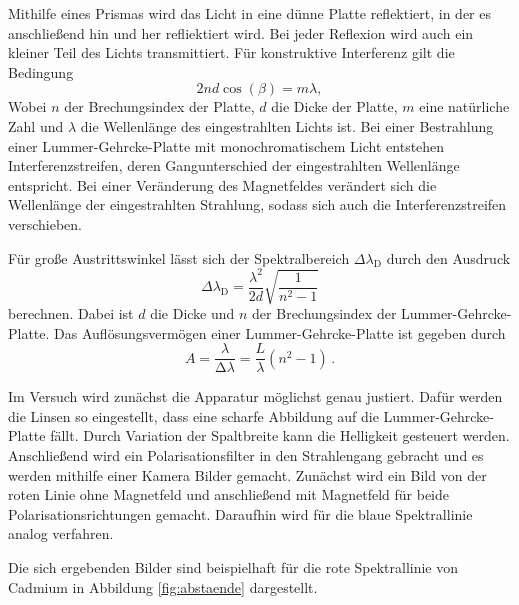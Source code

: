 Mithilfe eines Prismas wird das Licht in eine dünne Platte reflektiert, in der
es anschließend hin und her refliektiert wird. Bei jeder Reflexion wird auch ein kleiner
Teil des Lichts transmittiert. Für konstruktive Interferenz gilt die Bedingung
\begin{equation}
  2n d \cos(\beta)=m \lambda,
\end{equation}
Wobei $n$ der Brechungsindex der Platte, $d$ die Dicke der Platte, $m$ eine natürliche
Zahl und $\lambda$ die Wellenlänge des eingestrahlten Lichts ist. Bei einer Bestrahlung einer
Lummer-Gehrcke-Platte mit monochromatischem Licht entstehen Interferenzstreifen, deren
Gangunterschied der eingestrahlten Wellenlänge entspricht. Bei einer Veränderung
des Magnetfeldes verändert sich die Wellenlänge der eingestrahlten Strahlung, sodass
sich auch die Interferenzstreifen verschieben.

Für große Austrittswinkel lässt sich der Spektralbereich $\Delta \lambda_\text{D}$ durch
den Ausdruck
\begin{equation}
   \Delta \lambda_\text{D} = \frac{\lambda^2}{2d} \sqrt{\frac{1}{n^2-1}}
   \label{eqn:deltaLambdaD}
\end{equation}
berechnen. Dabei ist $d$ die Dicke und $n$ der Brechungsindex der Lummer-Gehrcke-Platte.
Das Auflösungsvermögen einer Lummer-Gehrcke-Platte ist gegeben durch
\begin{equation}
  A = \frac{\lambda}{\increment \lambda} = \frac{L}{\lambda}(n^2-1) \,.
\end{equation}

Im Versuch wird zunächst die Apparatur möglichst genau justiert. Dafür werden
die Linsen so eingestellt, dass eine scharfe Abbildung auf die Lummer-Gehrcke-Platte
fällt. Durch Variation der Spaltbreite kann die Helligkeit gesteuert werden.
Anschließend wird ein Polarisationsfilter in den Strahlengang gebracht und es werden
mithilfe einer Kamera Bilder gemacht. Zunächst wird ein Bild von der roten Linie ohne
Magnetfeld und anschließend mit Magnetfeld für beide Polarisationsrichtungen gemacht.
Daraufhin wird für die blaue Spektrallinie analog verfahren.

Die sich ergebenden Bilder sind beispielhaft für die rote Spektrallinie von Cadmium in Abbildung \ref{fig:abstaende} dargestellt.

